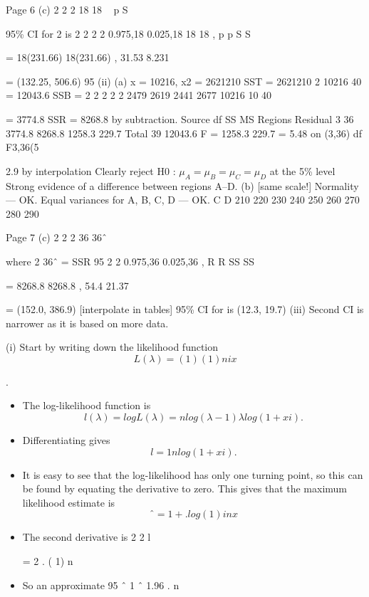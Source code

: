 \documentclass[a4paper,12pt]{article}
\begin{document}
Page 6
(c)
2
2
2 18
18
~ p
S


 95\% CI for 2 is
2 2
2 2
0.975,18 0.025,18
18 18
, p p
 S S 
 
=
18(231.66) 18(231.66)
,
31.53 8.231


= (132.25, 506.6)
 95%
(ii) (a) x = 10216, x2 = 2621210
SST = 2621210 
2 10216
40
= 12043.6
SSB =
2 2 2 2 2 2479 2619 2441 2677 10216
10 40
  
 = 3774.8
 SSR = 8268.8 by subtraction.
Source df SS MS
Regions
Residual
3
36
3774.8
8268.8
1258.3
229.7
Total 39 12043.6
F =
1258.3
229.7
= 5.48 on (3,36) df
F3,36(5%

2.9 by interpolation
Clearly reject H0 : $\mu_A = \mu_B = \mu_C = \mu_D$ at the 5\% level
 Strong evidence of a difference between regions A–D.
(b)
[same scale!]
Normality — OK.
Equal variances for A, B, C, D — OK.
 C
D
210 220 230 240 250 260 270 280 290

Page 7
(c)
2
2
2 36
36ˆ
~



where 2 36ˆ = SSR
 95%
2 2
0.975,36 0.025,36
,
R R  SS SS 

=
8268.8 8268.8
,
54.4 21.37
 

= (152.0, 386.9) [interpolate in tables]
 95\% CI for  is (12.3, 19.7)
(iii) Second CI is narrower as it is based on more data.



\item (i) Start by writing down the likelihood function
\[L(\lambda) =
( 1)
(1 )
n
i x\]

 
 
.
\begin{itemize}
    \item The log-likelihood function is
\[l(\lambda) = log L(\lambda) = n log(\lambda -1)  \lambda log(1 + xi).\]
\item Differentiating gives
\[l

=
1
n
 
 log(1 + xi).\]
\item It is easy to see that the log-likelihood has only one turning point, so this
can be found by equating the derivative to zero. This gives that the
maximum likelihood estimate is
\[ˆ
= 1 + .
log(1 ) i
n
  x\]
\item The second derivative is
2
2
 l

= 2 .
( 1)
n
 
\item So an approximate 95%
ˆ 1
ˆ 1.96 .
n
 
\end{itemize}
\end{document}
